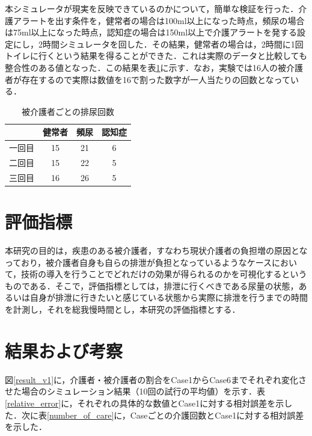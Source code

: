 本シミュレータが現実を反映できているのかについて，簡単な検証を行った．介護アラートを出す条件を，健常者の場合は100ml以上になった時点，頻尿の場合は75ml以上になった時点，認知症の場合は150ml以上で介護アラートを発する設定にし，2時間シミュレータを回した．その結果，健常者の場合は，2時間に1回トイレに行くという結果を得ることができた．これは実際のデータと比較しても整合性のある値となった．この結果を表\ref{number_of_urination}に示す．なお，実験では16人の被介護者が存在するので実際は数値を16で割った数字が一人当たりの回数となっている．

\begin{table}[htb]
  \caption[被介護者ごとの排尿回数]{被介護者ごとの排尿回数}
  \label{number_of_urination}
  \centering
  \begin{tabular}{r|c|c|c}
     & 健常者 & 頻尿 & 認知症 \\ \hline
    一回目 & 15 & 21 & 6 \\
    二回目 & 15 & 22 & 5 \\
    三回目 & 16 & 26 & 5 \\
    \end{tabular}
\end{table}

\section{評価指標}

本研究の目的は，疾患のある被介護者，すなわち現状介護者の負担増の原因となっており，被介護者自身も自らの排泄が負担となっているようなケースにおいて，技術の導入を行うことでどれだけの効果が得られるのかを可視化するというものである．そこで，評価指標としては，排泄に行くべきである尿量の状態，あるいは自身が排泄に行きたいと感じている状態から実際に排泄を行うまでの時間を計測し，それを総我慢時間とし，本研究の評価指標とする．

\section{結果および考察}

図\ref{result_v1}に，介護者・被介護者の割合をCase1からCase6までそれぞれ変化させた場合のシミュレーション結果（10回の試行の平均値）を示す．表\ref{relative_error}に，それぞれの具体的な数値とCase1に対する相対誤差を示した．次に表\ref{number_of_care}に，Caseごとの介護回数とCase1に対する相対誤差を示した．

